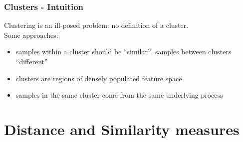 \documentclass[Nike]{tuberlinbeamer}
\begin{document}
\begin{frame}
 \frametitle{Clusters - Intuition}
  Clustering is an ill-posed problem: no definition of a cluster.\\
  Some approaches:
  \begin{itemize}
    \item samples within a cluster should be ``similar'', samples between clusters ``different''
    \item clusters are regions of densely populated feature space
    \item samples in the same cluster come from the same underlying process
  \end{itemize}
\end{frame}


\section{Distance and Similarity measures}
\end{document}
